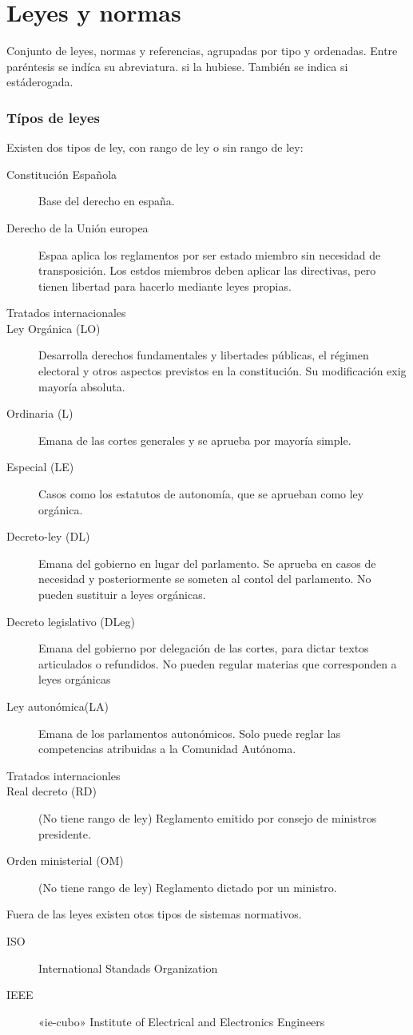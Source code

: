 \section{Leyes y normas}
Conjunto de leyes, normas y referencias, agrupadas por tipo y ordenadas. Entre paréntesis se indíca su abreviatura. si la hubiese. También se indica si estáderogada.
\subsubsection{Típos de leyes}
    Existen dos tipos de ley, con rango de ley o sin rango de ley:
    \begin{description}
        \item[Constitución Española] Base del derecho en españa.
        \item[Derecho de la Unión europea] Espaa aplica los reglamentos por ser estado miembro sin necesidad de transposición. Los estdos miembros deben aplicar las directivas, pero tienen libertad para hacerlo mediante leyes propias.
        \item[Tratados internacionales]  
        \item[Ley Orgánica (LO) ] Desarrolla derechos fundamentales y libertades públicas, el régimen electoral y otros aspectos previstos en la constitución. Su modificación exig mayoría absoluta.
        \item[Ordinaria (L)] Emana de las cortes generales y se aprueba por mayoría simple.
        \item[Especial (LE)] Casos como los estatutos de autonomía, que se aprueban como ley orgánica.
        \item[Decreto-ley (DL)] Emana del gobierno en lugar del parlamento. Se aprueba en casos de necesidad y posteriormente se someten al contol del parlamento. No pueden sustituir a leyes orgánicas.
        \item[Decreto legislativo (DLeg)] Emana del gobierno por delegación de las cortes, para dictar textos articulados o refundidos. No pueden regular materias que corresponden a leyes orgánicas
        \item[Ley autonómica(LA)] Emana de los parlamentos autonómicos. Solo puede reglar las competencias atribuidas a la Comunidad Autónoma.
        \item[Tratados internacionles]
        \item[Real decreto (RD)] (No tiene rango de ley) Reglamento emitido por consejo de ministros  presidente.
        \item[Orden ministerial (OM)] (No tiene rango de ley) Reglamento dictado por un ministro.
    \end{description}
    Fuera de las leyes existen otos tipos de sistemas normativos.
    \begin{description}
        \item[ISO] International Standads Organization
        \item[IEEE] «ie-cubo» Institute of Electrical and Electronics Engineers
    \end{description}
\noindent
